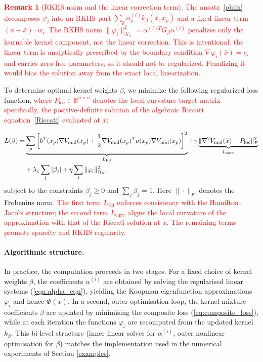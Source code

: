 \documentclass[11pt]{article}
\theoremstyle{plain}      %
\theoremstyle{definition} %
\newtheorem{remark}[theorem]{Remark}
\begin{document}
\textcolor{red}{
\begin{remark}[RKHS norm and the linear correction term]
The ansatz~\eqref{phiix} decomposes $\varphi_i$ into an RKHS part $\sum_p \alpha_p^{(i)} k_\beta(x,x_p)$ and a fixed linear term $(x-\bar{x})\cdot w_i$. The RKHS norm $\|\varphi_i\|_{\mathcal{H}_k}^2 = \alpha^{(i)T}G_\beta\alpha^{(i)}$ penalizes only the learnable kernel component, not the linear correction. This is intentional: the linear term is analytically prescribed by the boundary condition $\nabla\varphi_i(\bar{x})=e_i$ and carries zero free parameters, so it should not be regularized. Penalizing it would bias the solution away from the exact local linearization.
\end{remark}
}

To determine optimal kernel weights \( \beta \), we minimize the following regularized loss function, \textcolor{red}{where $P_{\text{loc}} \in \mathbb{R}^{n \times n}$ denotes the local curvature target matrix---specifically, the positive-definite solution of the algebraic Riccati equation~\eqref{Riccati} evaluated at $\bar{x}$:}

\begin{align}\label{eq:composite_loss}
L(\beta) = & \underbrace{\sum_p \left[ b^{T}(x_p)\nabla V_{\text{mid}}(x_p) + \frac{1}{2} \nabla V_{\text{mid}}(x_p)^{T}a(x_p)\nabla V_{\text{mid}}(x_p)\right]^2}_{L_{\text{HJ}}}
+ \gamma \underbrace{\|\nabla^2 V_{\text{mid}}(\bar{x}) - P_{\text{loc}}\|_F^2}_{L_{\text{curv}}} \notag \\
& + \lambda_1 \sum_j |\beta_j| + \eta \sum_i \|\varphi_i\|_{\mathcal{H}_k}^2,
\end{align}
subject to the constraints \( \beta_j \ge 0 \) and \( \sum_j \beta_j = 1 \). Here $\| \cdot \|_F$ denotes the Frobenius norm. \textcolor{red}{The first term $L_{\text{HJ}}$ enforces consistency with the Hamilton--Jacobi structure; the second term $L_{\text{curv}}$ aligns the local curvature of the approximation with that of the Riccati solution at $\bar{x}$. The remaining terms promote sparsity and RKHS regularity.}

\paragraph{Algorithmic structure.}
In practice, the computation proceeds in two stages. For a fixed choice of kernel weights $\beta$, the coefficients $\alpha^{(i)}$ are obtained by solving the regularised linear systems (\ref{eqn:alpha_eqn}), yielding the Koopman eigenfunction approximations $\varphi_i$ and hence $\Phi(x)$.  In a second, outer optimisation loop, the kernel mixture coefficients $\beta$ are updated by minimising the composite loss (\ref{eq:composite_loss}), while at each iteration the functions $\varphi_i$ are recomputed from the updated kernel $k_\beta$.  This bi-level structure (inner linear solves for $\alpha^{(i)}$, outer nonlinear optimisation for $\beta$) matches the implementation used in the numerical experiments of Section \ref{examples}.
\end{document}
